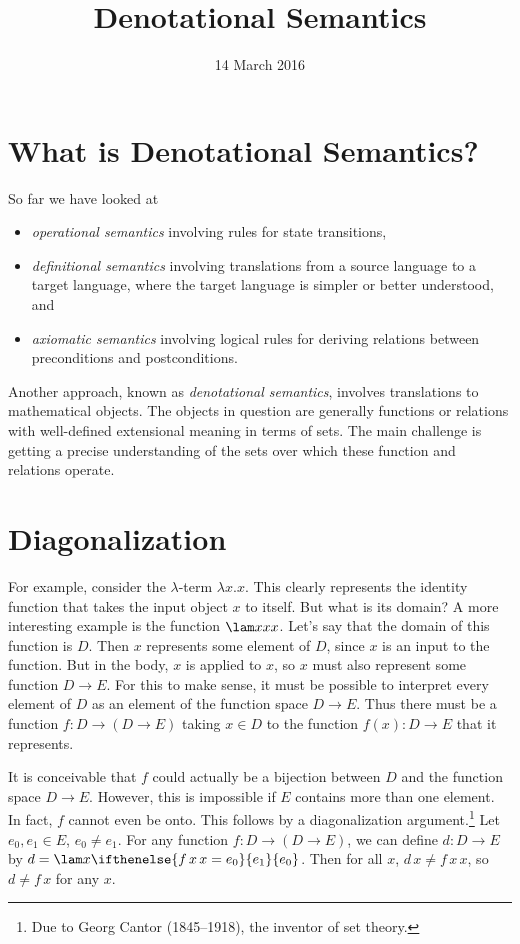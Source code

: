 \title{Denotational Semantics}
\date{14 March 2016}
\maketitle

\section{What is Denotational Semantics?}

So far we have looked at
\begin{itemize}
\item
\emph{operational semantics} involving rules for state transitions,
\item
\emph{definitional semantics} involving translations from a source language to a target language,
where the target language is simpler or better understood, and
\item
\emph{axiomatic semantics} involving logical rules for deriving relations between preconditions
and postconditions.
\end{itemize}
Another approach, known as \emph{denotational semantics}, involves translations to mathematical objects.
The objects in question are generally functions or relations with well-defined extensional meaning in terms of sets.
The main challenge is getting a precise understanding of the sets over which these function and relations operate.

\section{Diagonalization}

For example, consider the $\lambda$-term $\lambda x.x$. 
This clearly represents the identity function that takes the
input object $x$ to itself. But what is its domain? A more interesting example is the function $\lam x{xx}$.
Let's say that the domain of this function is $D$. Then $x$ represents some element of $D$, since $x$ is an input to the function. But in the body, $x$ is applied to $x$, so $x$ must also represent some function $D\to E$.
For this to make sense, it must be possible to interpret every element of $D$ as an element of the function space $D\to E$. Thus there must be a function $f:D\to(D\to E)$ taking $x\in D$ to the function $f(x):D\to E$ that it represents.

It is conceivable that $f$ could actually be a bijection between $D$ and the function space $D \to
E$. However, this is impossible if $E$ contains more than one element. In fact, $f$ cannot even be onto. This
follows by a diagonalization argument.\footnote{Due to Georg Cantor (1845--1918), the inventor of set theory.} Let $e_0,e_1\in E$, $e_0\neq e_1$.
For any function $f:D\to(D\to E)$, we can define $d:D\to E$ by $d = \lam x{\ifthenelse{f\,x\,x=e_0}{e_1}{e_0}}$. Then for all $x$, $d\,x\neq f\,x\,x$, so $d\neq f\,x$ for any $x$.


